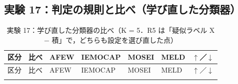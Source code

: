 \subsection*{実験 17：判定の規則と比べ（学び直した分類器）}
\begin{longtable}{>{\raggedright}p{0.75cm}>{\raggedright}p{5.6cm}>{\raggedright}p{2.05cm}>{\raggedright}p{2.05cm}>{\raggedright}p{2.05cm}>{\raggedright}p{2.05cm}p{0.75cm}}
\caption{実験 17：学び直した分類器の比べ（K = 5．R5 は「疑似ラベル X − 積」で，どちらも設定を選び直した点）}\\
\toprule
区分 & 比べ & AFEW & IEMOCAP & MOSEI & MELD & $\uparrow$／$\downarrow$ \\
\midrule
\endfirsthead
\toprule
区分 & 比べ & AFEW & IEMOCAP & MOSEI & MELD & $\uparrow$／$\downarrow$ \\
\midrule
\endhead
\bottomrule
\endfoot


\end{longtable}

